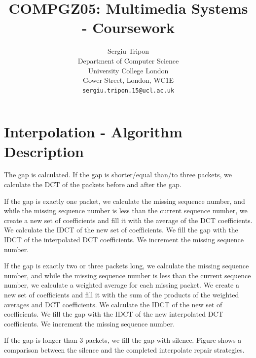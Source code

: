 \documentclass{article} %
\title{COMPGZ05: Multimedia Systems - Coursework}
\author{
Sergiu Tripon\\
Department of Computer Science\\
University College London\\
Gower Street, London, WC1E\\
\texttt{sergiu.tripon.15@ucl.ac.uk}\\
}
\begin{document}
\maketitle

\section{Interpolation - Algorithm Description}

The gap is calculated. If the gap is shorter/equal than/to three packets, we calculate the DCT of the packets before and after the gap.

If the gap is exactly one packet, we calculate the missing sequence number, and while the missing sequence number is less than the current sequence number, we create a new set of coefficients and fill it with the average of the DCT coefficients. We calculate the IDCT of the new set of coefficients. We fill the gap with the IDCT of the interpolated DCT coefficients. We increment the missing sequence number.

If the gap is exactly two or three packets long, we calculate the missing sequence number, and while the missing sequence number is less than the current sequence number, we calculate a weighted average for each missing packet. We create a new set of coefficients and fill it with the sum of the products of the weighted averages and DCT coefficients. We calculate the IDCT of the new set of coefficients. We fill the gap with the IDCT of the new interpolated DCT coefficients. We increment the missing sequence number.

If the gap is longer than 3 packets, we fill the gap with silence. Figure shows a comparison between the silence and the completed interpolate repair strategies.

\begin{figure}[!htbp]
\centering
{}
\end{figure}
\end{document}
